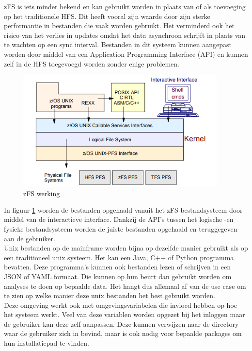 zFS is iets minder bekend en kan gebruikt worden in plaats van of als toevoeging op het traditionele HFS. Dit heeft vooral zijn waarde door zijn sterke performantie in bestanden die vaak worden gebruikt. Het verminderd ook het risico van het verlies in updates omdat het data asynchroon schrijft in plaats van te wachten op een sync interval. Bestanden in dit systeem kunnen aangepast worden door middel van een Application Programming Interface (API) en kunnen zelf in de HFS toegevoegd worden zonder enige problemen. \autocite{IBM2012} \\

\begin{figure}[pt!]
    \centering
    \includegraphics[width=300pt]{./graphics/zFS.png}
    \caption{zFS werking \autocite{IBM2012}}
    \label{fig:zFS}
\end{figure}

In figuur \ref{fig:zFS} worden de bestanden opgehaald vanuit het zFS bestandsysteem door middel van de interactieve interface. Dankzij de API's tussen het logische -en fysieke bestandsysteem worden de juiste bestanden opgehaald en teruggegeven aan de gebruiker. \autocite{IBM2012} \\

Unix bestanden op de mainframe worden bijna op dezelfde manier gebruikt als op een traditioneel unix systeem. Het kan een Java, C++ of Python programma bevatten. Deze programma's kunnen ook bestanden lezen of schrijven in een JSON of YAML formaat. Die kunnen op hun beurt dan gebruikt worden om analyses te doen op bepaalde data. Het hangt dus allemaal af van de use case om te zien op welke manier deze unix bestanden het best gebruikt worden. \autocite{Precisely2020} \\

Deze omgeving werkt ook met omgevingsvariabelen die invloed hebben op hoe het systeem werkt. Veel van deze variablen worden opgezet bij het inloggen maar de gebruiker kan deze zelf aanpassen. Deze kunnen verwijzen naar de directory waar de gebruiker zich in bevind, maar is ook nodig voor bepaalde packages om hun installatiepad te vinden. \autocite{HenryStocker2017}

